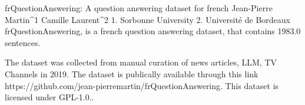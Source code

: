 
frQuestionAnswering: A question answering dataset for french
Jean-Pierre Martin^1 Camille Laurent^2
1. Sorbonne University 2. Université de Bordeaux
frQuestionAnswering, is a french question answering dataset, that contains 1983.0 sentences.

The dataset was collected from manual curation of news articles, LLM, TV Channels in 2019. 
The dataset is publically available through this link https://github.com/jean-pierremartin/frQuestionAnswering. This dataset is licensed under GPL-1.0..

